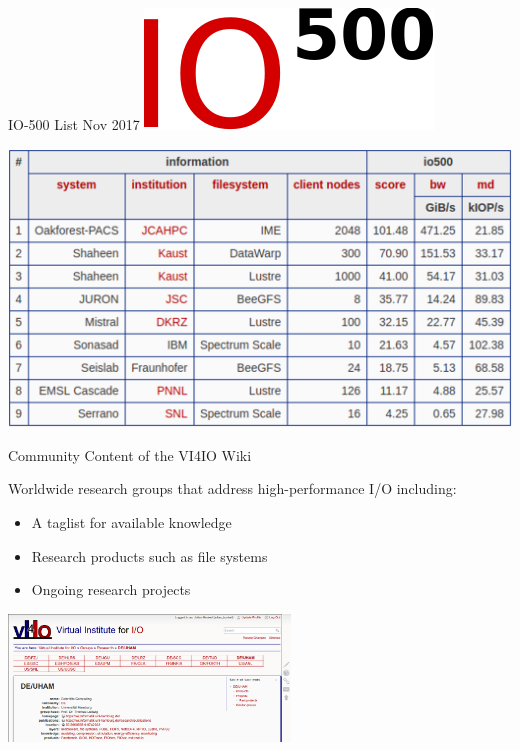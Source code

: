 \documentclass[portrait,a0paper,fontscale=0.4]{baposter}
\newcommand{\compresslist}{%
\setlength{\itemsep}{1pt}%
\setlength{\parskip}{0pt}%
\setlength{\parsep}{0pt}%
}
\begin{document}
\begin{poster}
\begin{posterbox}[name=io500res,column=0,above=bottom,below=wps]{IO-500 List Nov 2017}
  \includegraphics[width=\textwidth]{logo-io500.pdf}

  \vspace*{1em}
  
  \includegraphics[width=\textwidth]{io500}
\end{posterbox}


\begin{posterbox}[name=concept,column=1,span=2]{Community Content of the VI4IO Wiki}
\begin{minipage}{7cm}
Worldwide research groups that address high-performance I/O including:

\vspace*{-1em}
\begin{itemize}\compresslist
\item A taglist for available knowledge
\item Research products such as file systems
\item Ongoing research projects
\end{itemize}

\includegraphics[width=7.5cm]{groups}


\end{minipage}
\end{posterbox}
\end{poster}
\end{document}
